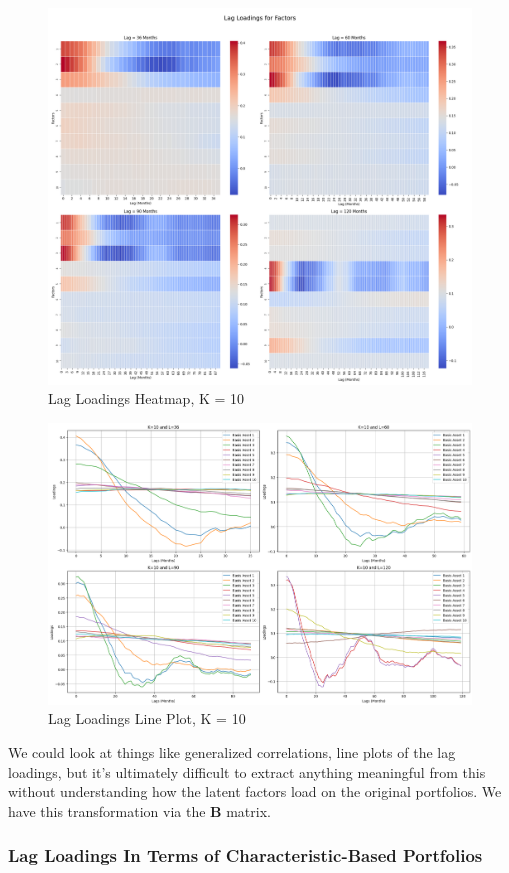 \documentclass{article}
\begin{document}
\begin{figure}[H]
    \centering
    \includegraphics[width=0.85\linewidth]{W_10.png}
    \caption{Lag Loadings Heatmap, K = 10}
    \label{fig:W_10}
\end{figure}
\begin{figure}[H]
    \centering
    \includegraphics[width=0.85\linewidth]{W_10_line.png}
    \caption{Lag Loadings Line Plot, K = 10}
    \label{fig:W_10_line}
\end{figure}


We could look at things like generalized correlations, line plots of the lag loadings, but it's ultimately 
difficult to extract anything meaningful from this without understanding how the latent factors load 
on the original portfolios. We have this transformation via the $\bm{B}$ matrix. 

\subsubsection{Lag Loadings In Terms of Characteristic-Based Portfolios}
\end{document}
